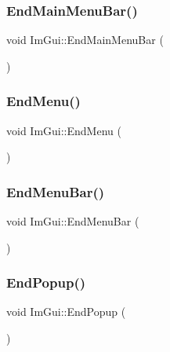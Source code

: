 \mbox{\label{namespace_im_gui_ab92f330c808546b340eb7bdf7e5f7c95}} 
\subsubsection{\texorpdfstring{End\+Main\+Menu\+Bar()}{EndMainMenuBar()}}
{\footnotesize\ttfamily void Im\+Gui\+::\+End\+Main\+Menu\+Bar (\begin{DoxyParamCaption}{ }\end{DoxyParamCaption})}

\mbox{\label{namespace_im_gui_a1448a5a4e8c431c15f991e9255c0df95}} 
\subsubsection{\texorpdfstring{End\+Menu()}{EndMenu()}}
{\footnotesize\ttfamily void Im\+Gui\+::\+End\+Menu (\begin{DoxyParamCaption}{ }\end{DoxyParamCaption})}

\mbox{\label{namespace_im_gui_aa226265c140eb6ee375c5b9abc69c4fc}} 
\subsubsection{\texorpdfstring{End\+Menu\+Bar()}{EndMenuBar()}}
{\footnotesize\ttfamily void Im\+Gui\+::\+End\+Menu\+Bar (\begin{DoxyParamCaption}{ }\end{DoxyParamCaption})}

\mbox{\label{namespace_im_gui_aa6a9b5696f2ea7eed7683425fc77b8f2}} 
\subsubsection{\texorpdfstring{End\+Popup()}{EndPopup()}}
{\footnotesize\ttfamily void Im\+Gui\+::\+End\+Popup (\begin{DoxyParamCaption}{ }\end{DoxyParamCaption})}

